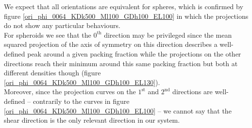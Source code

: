 \documentclass[class=report, float=false, crop=false]{standalone}
\begin{document}
We expect that all orientations are equivalent for spheres, which is confirmed by figure \ref{ori_phi_0064_KDk500_Ml100_GDh100_EL100} in which the projections do not show any particular behaviours.\\

For spheroids we see that the $0^{\text{th}}$ direction may be privileged since the mean squared projection of the axis of symmetry on this direction describes a well-defined peak around a given packing fraction while the projections on the other directions reach their minimum around this same packing fraction but both at different densities though (figure \ref{ori_phi_0064_KDk500_Ml100_GDh100_EL130}).\\

Moreover, since the projection curves on the $1^{\text{st}}$ and $2^{\text{nd}}$ directions are well-defined -- contrarily to the curves in figure \ref{ori_phi_0064_KDk500_Ml100_GDh100_EL100} -- we cannot say that the shear direction is the only relevant direction in our system.

\end{document}
